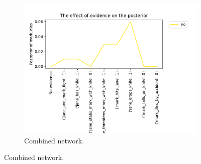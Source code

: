 \begin{enumerate}
\begin{figure}[htbp]
\begin{subfigure}{.5\textwidth}
\centering
\includegraphics[width=0.95\linewidth]{../experiments/VlekNetwork/plots/posterior_base_networkKBFull.pdf}
\caption{Combined network.}
\label{fulla}
\end{subfigure}

\end{figure}

\end{enumerate}


